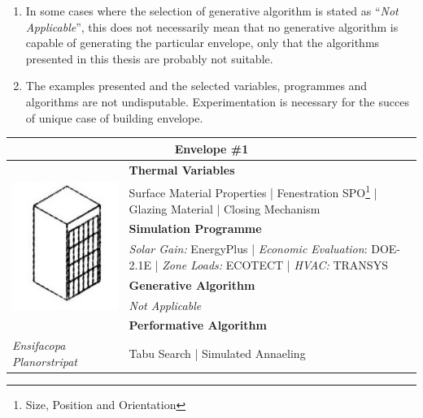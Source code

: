 \vspace{-0.4cm}
\begin{enumerate}
	\item In some cases where the selection of generative algorithm is stated as ``\emph{Not Applicable}'', this does not necessarily mean that no generative algorithm is capable of generating the particular envelope, only that the algorithms presented in this thesis are probably not suitable.
	\item The examples presented and the selected variables, programmes and algorithms are not undisputable. Experimentation is necessary for the succes of unique case of building envelope.
\end{enumerate}

\clearpage

\begin{table}
	\begin{tabular}{ | m{6cm} | m{14cm} |}
	\toprule
	\multicolumn{2}{c}{Envelope \#{}1} \\[1cm] \hline
	\multirow{7}{*}{\includegraphics[width=5cm]{./Images/10-Envelope1}} & \textbf{Thermal Variables} \\[1cm]
	& Surface Material Properties | Fenestration SPO\footnote{Size, Position and Orientation} | Glazing Material | Closing Mechanism\vspace{0.5cm}\\ \cline{2-2}
		 & \textbf{Simulation Programme} \\[1cm]
		 & \emph{Solar Gain:} EnergyPlus | \emph{Economic Evaluation}: DOE-2.1E | \emph{Zone Loads:} ECOTECT | \emph{HVAC:} TRANSYS \vspace{0.5cm}\\ \cline{2-2}
		 & \textbf{Generative Algorithm} \\[1cm]
		 & \emph{Not Applicable}\vspace{0.5cm}\\ \cline{2-2}
		 & \textbf{Performative Algorithm} \\[1cm]
		 \emph{Ensifacopa Planorstripat} &  Tabu Search | Simulated Annaeling\vspace{0.5cm}\\
	\bottomrule
	\end{tabular}
\end{table}

